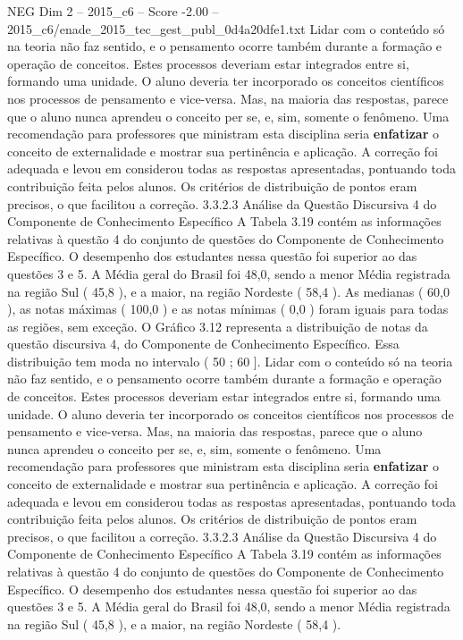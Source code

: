 \begin{textsample}{NEG Dim 2 – 2015\_c6 – Score -2.00 – 2015\_c6/enade\_2015\_tec\_gest\_publ\_0d4a20dfe1.txt}
Lidar com o conteúdo só na teoria não faz sentido, e o pensamento ocorre também durante a formação e operação de conceitos.
Estes processos deveriam estar integrados entre si, formando uma unidade.
O aluno deveria ter incorporado os conceitos científicos nos processos de pensamento e vice-versa.
Mas, na maioria das respostas, parece que o aluno nunca aprendeu o conceito per se, e, sim, somente o fenômeno.
Uma recomendação para professores que ministram esta disciplina seria \textbf{enfatizar} o conceito de externalidade e mostrar sua pertinência e aplicação.
A correção foi adequada e levou em considerou todas as respostas apresentadas, pontuando toda contribuição feita pelos alunos.
Os critérios de distribuição de pontos eram precisos, o que facilitou a correção. 3.3.2.3 Análise da Questão Discursiva 4 do Componente de Conhecimento Específico A Tabela 3.19 contém as informações relativas à questão 4 do conjunto de questões do Componente de Conhecimento Específico.
O desempenho dos estudantes nessa questão foi superior ao das questões 3 e 5.
A Média geral do Brasil foi 48,0, sendo a menor Média registrada na região Sul ( 45,8 ), e a maior, na região Nordeste ( 58,4 ).
As medianas ( 60,0 ), as notas máximas ( 100,0 ) e as notas mínimas ( 0,0 ) foram iguais para todas as regiões, sem exceção.
O Gráfico 3.12 representa a distribuição de notas da questão discursiva 4, do Componente de Conhecimento Específico.
Essa distribuição tem moda no intervalo ( 50 ; 60 ].
Lidar com o conteúdo só na teoria não faz sentido, e o pensamento ocorre também durante a formação e operação de conceitos.
Estes processos deveriam estar integrados entre si, formando uma unidade.
O aluno deveria ter incorporado os conceitos científicos nos processos de pensamento e vice-versa.
Mas, na maioria das respostas, parece que o aluno nunca aprendeu o conceito per se, e, sim, somente o fenômeno.
Uma recomendação para professores que ministram esta disciplina seria \textbf{enfatizar} o conceito de externalidade e mostrar sua pertinência e aplicação.
A correção foi adequada e levou em considerou todas as respostas apresentadas, pontuando toda contribuição feita pelos alunos.
Os critérios de distribuição de pontos eram precisos, o que facilitou a correção. 3.3.2.3 Análise da Questão Discursiva 4 do Componente de Conhecimento Específico A Tabela 3.19 contém as informações relativas à questão 4 do conjunto de questões do Componente de Conhecimento Específico.
O desempenho dos estudantes nessa questão foi superior ao das questões 3 e 5.
A Média geral do Brasil foi 48,0, sendo a menor Média registrada na região Sul ( 45,8 ), e a maior, na região Nordeste ( 58,4 ).

\end{textsample}
